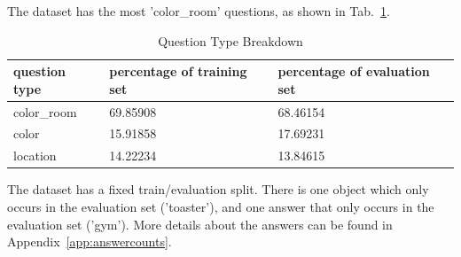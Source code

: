 The dataset has the most 'color\_room' questions, as shown in Tab.~\ref{tab:q_breakdown}.

\begin{table}[h]
\centering
\caption{Question Type Breakdown}
\begin{tabular}{ |l|l|l| }
\hline
\textbf{question type} & \textbf{percentage of training set} & \textbf{percentage of evaluation set} \\
\hline
color\_room & 69.85908 & 68.46154\\
color & 15.91858 & 17.69231\\
location & 14.22234 & 13.84615\\
\hline
\end{tabular}
\label{tab:q_breakdown}
\end{table}

The dataset has a fixed train/evaluation split. There is one object which only occurs in the evaluation set ('toaster'), and one answer that only occurs in the evaluation set ('gym'). More details about the answers can be found in Appendix~\ref{app:answercounts}.

